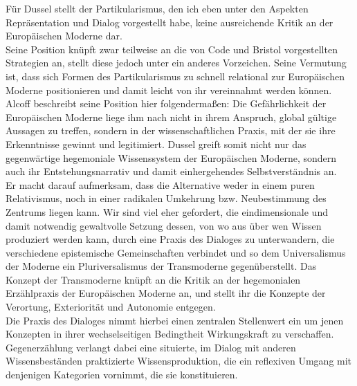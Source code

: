 Für Dussel stellt der Partikularismus, den ich eben unter den Aspekten
Repräsentation und Dialog vorgestellt habe, keine ausreichende Kritik an der
Europäischen Moderne dar. \\
Seine Position knüpft zwar teilweise an die von Code
und Bristol vorgestellten Strategien an, stellt diese jedoch unter ein anderes
Vorzeichen. Seine Vermutung ist, dass sich Formen des Partikularismus zu schnell
relational zur Europäischen Moderne positionieren und damit leicht von ihr
vereinnahmt werden können. Alcoff beschreibt seine Position hier folgendermaßen:
Die Gefährlichkeit der Europäischen Moderne liege ihm nach nicht in ihrem
Anspruch, global gültige Aussagen zu treffen, sondern in der wissenschaftlichen
Praxis, mit der sie ihre Erkenntnisse gewinnt und legitimiert.\footnotemark
{} Dussel greift somit nicht
nur das gegenwärtige hegemoniale Wissenssystem der Europäischen Moderne, sondern
auch ihr Entstehungsnarrativ und damit einhergehendes Selbstverständnis an.\\

\noindent Er macht darauf aufmerksam, dass die Alternative weder in einem puren
Relativismus, noch in einer radikalen Umkehrung bzw. Neubestimmung des Zentrums
liegen kann. Wir sind viel eher gefordert, die eindimensionale und damit
notwendig gewaltvolle Setzung dessen, von wo aus über wen Wissen produziert
werden kann, durch eine Praxis des Dialoges zu unterwandern, die verschiedene
epistemische Gemeinschaften verbindet und so dem Universalismus der Moderne ein
Pluriversalismus der Transmoderne gegenüberstellt. Das Konzept der Transmoderne
knüpft an die Kritik an der hegemonialen Erzählpraxis der Europäischen Moderne
an, und stellt ihr die Konzepte der Verortung, Exteriorität und Autonomie
entgegen. \\
Die Praxis des Dialoges nimmt hierbei einen zentralen Stellenwert ein
um jenen Konzepten in ihrer wechselseitigen Bedingtheit Wirkungskraft zu
verschaffen. Gegenerzählung verlangt dabei eine situierte, im Dialog mit anderen
Wissensbeständen praktizierte Wissensproduktion, die ein reflexiven Umgang mit
denjenigen Kategorien vornimmt, die sie konstituieren.\\

